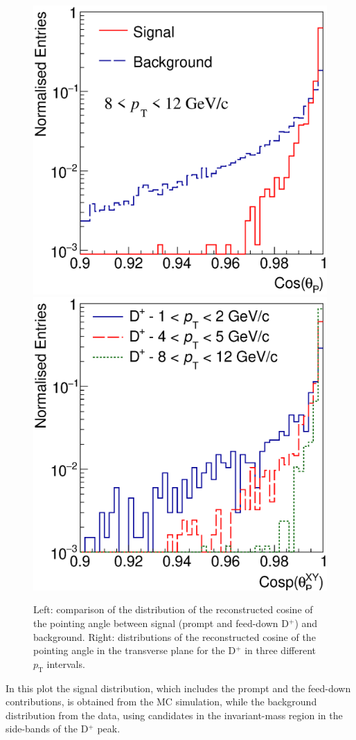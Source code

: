\documentclass[b5paper,10pt,twoside,oldstyle,classica]{toptesi}
\newcommand{\pt}{p_\text{T}}
\begin{document}
\begin{figure}[b]
\begin{center}
{\includegraphics[scale = 0.32]{CospComp_8-12.eps}}
\hspace{-0.5cm}
{\includegraphics[scale = 0.32]{CospXYCompPt.eps}}
\caption{Left: comparison of the distribution of the reconstructed cosine of the pointing angle between signal (prompt and feed-down D$^+$) and background. Right: distributions of the reconstructed cosine of the pointing angle in the transverse plane for the D$^+$ in three different $\pt$ intervals.}
\label{cosp}
\end{center}
\end{figure}
In this plot the signal distribution, which includes the prompt and the feed-down contributions, is obtained from the MC simulation, while the background distribution from the data, using candidates in the invariant-mass region in the side-bands of the D$^+$ peak.
\end{document}
